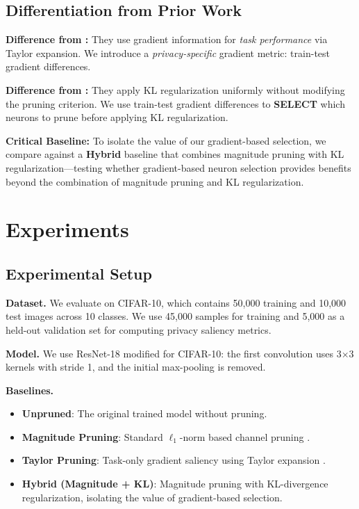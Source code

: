 \documentclass[11pt]{article}
\begin{document}
\subsection{Differentiation from Prior Work}

\textbf{Difference from \citet{molchanov2019importance}:} They use gradient information for \emph{task performance} via Taylor expansion. We introduce a \emph{privacy-specific} gradient metric: train-test gradient differences.

\textbf{Difference from \citet{yuan2022membership}:} They apply KL regularization uniformly without modifying the pruning criterion. We use train-test gradient differences to \textbf{SELECT} which neurons to prune before applying KL regularization.

\textbf{Critical Baseline:} To isolate the value of our gradient-based selection, we compare against a \textbf{Hybrid} baseline that combines magnitude pruning with KL regularization---testing whether gradient-based neuron selection provides benefits beyond the combination of magnitude pruning and KL regularization.

\section{Experiments}

\subsection{Experimental Setup}

\textbf{Dataset.} We evaluate on CIFAR-10, which contains 50,000 training and 10,000 test images across 10 classes. We use 45,000 samples for training and 5,000 as a held-out validation set for computing privacy saliency metrics.

\textbf{Model.} We use ResNet-18 modified for CIFAR-10: the first convolution uses 3$\times$3 kernels with stride 1, and the initial max-pooling is removed.

\textbf{Baselines.}
\begin{itemize}
    \item \textbf{Unpruned}: The original trained model without pruning.
    \item \textbf{Magnitude Pruning}: Standard $\ell_1$-norm based channel pruning \citep{han2015learning}.
    \item \textbf{Taylor Pruning}: Task-only gradient saliency using Taylor expansion \citep{molchanov2019importance}.
    \item \textbf{Hybrid (Magnitude + KL)}: Magnitude pruning with KL-divergence regularization, isolating the value of gradient-based selection.
\end{itemize}
\end{document}
